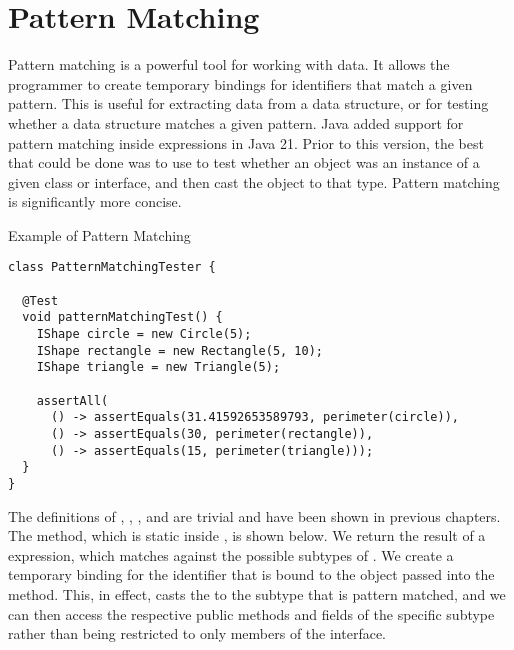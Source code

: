 \section{Pattern Matching}

Pattern matching is a powerful tool for working with data. It allows the programmer to create temporary bindings for identifiers that match a given pattern. This is useful for extracting data from a data structure, or for testing whether a data structure matches a given pattern. Java added support for pattern matching inside  expressions in Java 21. Prior to this version, the best that could be done was to use  to test whether an object was an instance of a given class or interface, and then cast the object to that type. Pattern matching is significantly more concise.


\begin{cl}[]{Example of Pattern Matching}
\begin{lstlisting}[language=MyJava]
class PatternMatchingTester {

  @Test
  void patternMatchingTest() {
    IShape circle = new Circle(5);
    IShape rectangle = new Rectangle(5, 10);
    IShape triangle = new Triangle(5);

    assertAll(
      () -> assertEquals(31.41592653589793, perimeter(circle)),
      () -> assertEquals(30, perimeter(rectangle)),
      () -> assertEquals(15, perimeter(triangle)));
  }
}
\end{lstlisting}
\end{cl}

The definitions of , , , and  are trivial and have been shown in previous chapters. The  method, which is static inside , is shown below. We return the result of a  expression, which matches against the possible subtypes of . We create a temporary binding for the identifier  that is bound to the  object passed into the method. This, in effect, casts the  to the subtype that is pattern matched, and we can then access the respective public methods and fields of the specific subtype rather than being restricted to only members of the  interface.

